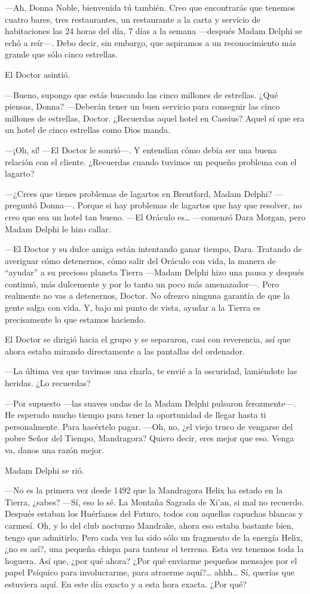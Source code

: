 ---Ah, Donna Noble, bienvenida tú también. Creo que encontrarás que
tenemos cuatro bares, tres restaurantes, un restaurante a la carta y
servicio de habitaciones las 24 horas del día, 7 días a la semana
---después Madam Delphi se echó a reír---. Debo decir, sin embargo, que
aspiramos a un reconocimiento más grande que sólo cinco estrellas.

El Doctor asintió.

---Bueno, supongo que estás buscando las cinco millones de estrellas.
¿Qué piensas, Donna? ---Deberán tener un buen servicio para conseguir
las cinco millones de estrellas, Doctor. ¿Recuerdas aquel hotel en
Cassius? Aquel sí que era un hotel de cinco estrellas como Dios manda.

---¡Oh, sí! ---El Doctor le sonrió---. Y entendían cómo debía ser una
buena relación con el cliente. ¿Recuerdas cuando tuvimos un pequeño
problema con el lagarto?

---¿Crees que tienes problemas de lagartos en Brentford, Madam Delphi?
---preguntó Donna---. Porque si hay problemas de lagartos que hay que
resolver, no creo que sea un hotel tan bueno. ---El Oráculo es\ldots{}
---comenzó Dara Morgan, pero Madam Delphi le hizo callar.

---El Doctor y su dulce amiga están intentando ganar tiempo, Dara.
Tratando de averiguar cómo detenernos, cómo salir del Oráculo con vida,
la manera de ``ayudar'' a su precioso planeta Tierra ---Madam Delphi
hizo una pausa y después continuó, más dulcemente y por lo tanto un poco
más amenazador---. Pero realmente no vas a detenernos, Doctor. No
ofrezco ninguna garantía de que la gente salga con vida. Y, bajo mi
punto de vista, ayudar a la Tierra es precisamente lo que estamos
haciendo.

El Doctor se dirigió hacia el grupo y se separaron, casi con reverencia,
así que ahora estaba mirando directamente a las pantallas del ordenador.

---La última vez que tuvimos una charla, te envié a la oscuridad,
lamiéndote las heridas. ¿Lo recuerdas?

---Por supuesto ---las suaves ondas de la Madam Delphi pulsaron
ferozmente---. He esperado mucho tiempo para tener la oportunidad de
llegar hasta ti personalmente. Para hacértelo pagar. ---Oh, no, ¿el
viejo truco de vengarse del pobre Señor del Tiempo, Mandragora? Quiero
decir, eres mejor que eso. Venga va, danos una razón mejor. ~

Madam Delphi se rió.

---No es la primera vez desde 1492 que la Mandragora Helix ha estado en
la Tierra, ¿sabes? ---Sí, eso lo sé. La Montaña Sagrada de Xi'an, si
mal no recuerdo. Después estaban los Huérfanos del Futuro, todos con
aquellas capuchas blancas y carmesí. Oh, y lo del club nocturno
Mandrake, ahora eso estaba bastante bien, tengo que admitirlo. Pero cada
vez ha sido sólo un fragmento de la energía Helix, ¿no es así?, una
pequeña chispa para tantear el terreno. Esta vez tenemos toda la
hoguera. Así que, ¿por qué ahora? ¿Por qué enviarme pequeños mensajes
por el papel Psíquico para involucrarme, para atraerme aquí?\ldots{}
ahhh\ldots{} Sí, querías que estuviera aquí. En este día exacto y a esta
hora exacta. ¿Por qué?

